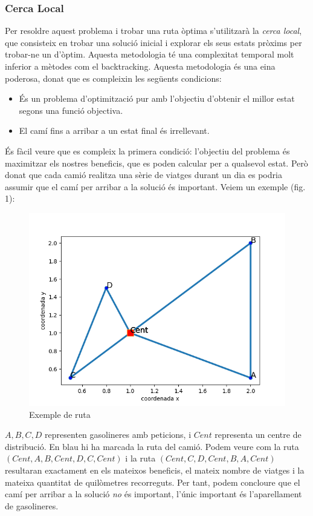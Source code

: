 \documentclass[a4paper]{article}
\begin{document}
\subsubsection{Cerca Local}
Per resoldre aquest problema i trobar una ruta òptima s'utilitzarà la \emph{cerca local}, que consisteix en trobar una solució inicial i explorar els seus estats pròxims per trobar-ne un d'òptim. Aquesta metodologia té una complexitat temporal molt inferior a mètodes com el backtracking. Aquesta metodologia és una eina poderosa, donat que es compleixin les següents condicions:
\begin{itemize}
\item És un problema d'optimització pur amb l'objectiu d'obtenir el millor estat segons una funció objectiva.
\item El camí fins a arribar a un estat final és irrellevant.
\end{itemize}

És fàcil veure que es compleix la primera condició: l'objectiu del problema és maximitzar els nostres beneficis, que es poden calcular per a qualsevol estat. Però donat que cada camió realitza una sèrie de viatges durant un dia es podria assumir que el camí per arribar a la solució és important. Veiem un exemple (fig. 1):
\begin{figure}[h]
\centering
\includegraphics[scale=0.65]{images/fig1.png}
\caption{Exemple de ruta}
\centering
\end{figure}

$A, B, C, D$ representen gasolineres amb peticions, i $Cent$ representa un centre de distribució. En blau hi ha marcada la ruta del camió. Podem veure com la ruta $(Cent,A,B,Cent,D,C,Cent)$ i la ruta $(Cent,C,D,Cent,B,A,Cent)$ resultaran exactament en els mateixos beneficis, el mateix nombre de viatges i la mateixa quantitat de quilòmetres recorreguts. Per tant, podem concloure que el camí per arribar a la solució \emph{no} és important, l'únic important és l'aparellament de gasolineres.\\
\end{document}

